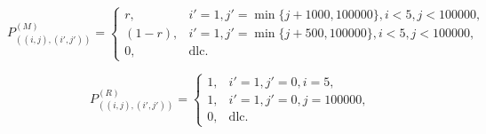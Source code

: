 \begin{enumerate}
	\[P_{((i,j),(i',j'))}^{(M)} = 
		\begin{cases}
		r,						&	i' = 1, j' = \min\{j + 1000, 100000\}, i < 5, j < 100000,\\
		(1-r),				&	i' = 1, j' = \min\{j + 500, 100000\}, i < 5, j < 100000,\\
		0,						& \text{dlc}.  
		\end{cases} \]
		

	\[P_{((i,j),(i',j'))}^{(R)} = 
		\begin{cases}
		1,		&	i' = 1, j' = 0, i = 5,\\
		1,		&	i' = 1, j' = 0, j = 100000,\\
		0,		& \text{dlc}.  
		\end{cases} \]
\end{enumerate}